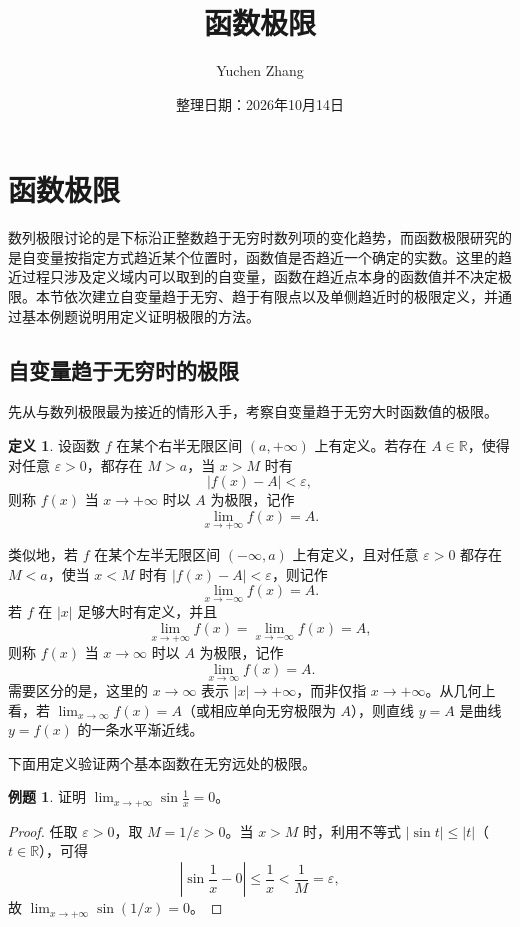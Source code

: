 \documentclass[UTF8,fontset=fandol,a4paper,12pt]{ctexart}
\title{函数极限}
\author{Yuchen Zhang}
\date{整理日期：2026年10月14日}
\makeatletter
\newcommand{\R}{\mathbb R}
\theoremstyle{definition}
\newtheorem*{definition}{定义}
\newtheorem*{example}{例题}
\renewcommand{\maketitle}{\begin{center}
{\LARGE\bfseries \@title\par}\vspace{0.6em}
\@author\par\vspace{0.2em}{\small\@date\par}
\end{center}}
\makeatother
\begin{document}
\maketitle
\setcounter{section}{2}
\section{函数极限}

数列极限讨论的是下标沿正整数趋于无穷时数列项的变化趋势，而函数极限研究的是自变量按指定方式趋近某个位置时，函数值是否趋近一个确定的实数。这里的趋近过程只涉及定义域内可以取到的自变量，函数在趋近点本身的函数值并不决定极限。本节依次建立自变量趋于无穷、趋于有限点以及单侧趋近时的极限定义，并通过基本例题说明用定义证明极限的方法。

\subsection*{自变量趋于无穷时的极限}
先从与数列极限最为接近的情形入手，考察自变量趋于无穷大时函数值的极限。

\begin{definition}
设函数 $f$ 在某个右半无限区间 $(a,+\infty)$ 上有定义。若存在 $A\in\R$，使得对任意 $\varepsilon>0$，都存在 $M>a$，当 $x>M$ 时有
\[
 |f(x)-A|<\varepsilon,
\]
则称 $f(x)$ 当 $x\to+\infty$ 时以 $A$ 为极限，记作
\[
 \lim_{x\to+\infty}f(x)=A.
\]
\end{definition}

类似地，若 $f$ 在某个左半无限区间 $(-\infty,a)$ 上有定义，且对任意 $\varepsilon>0$ 都存在 $M<a$，使当 $x<M$ 时有 $|f(x)-A|<\varepsilon$，则记作
\[
 \lim_{x\to-\infty}f(x)=A.
\]
若 $f$ 在 $|x|$ 足够大时有定义，并且
\[
 \lim_{x\to+\infty}f(x)=\lim_{x\to-\infty}f(x)=A,
\]
则称 $f(x)$ 当 $x\to\infty$ 时以 $A$ 为极限，记作
\[
 \lim_{x\to\infty}f(x)=A.
\]
需要区分的是，这里的 $x\to\infty$ 表示 $|x|\to+\infty$，而非仅指 $x\to+\infty$。从几何上看，若 $\lim_{x\to\infty}f(x)=A$（或相应单向无穷极限为 $A$），则直线 $y=A$ 是曲线 $y=f(x)$ 的一条水平渐近线。

下面用定义验证两个基本函数在无穷远处的极限。

\begin{example}
证明 $\displaystyle\lim_{x\to+\infty}\sin\frac1x=0$。
\end{example}
\begin{proof}
任取 $\varepsilon>0$，取 $M=1/\varepsilon>0$。当 $x>M$ 时，利用不等式 $|\sin t|\le |t|$（$t\in\R$），可得
\[
 \left|\sin\frac1x-0\right|\le\frac1x<\frac1M=\varepsilon,
\]
故 $\displaystyle\lim_{x\to+\infty}\sin(1/x)=0$。
\end{proof}
\end{document}
